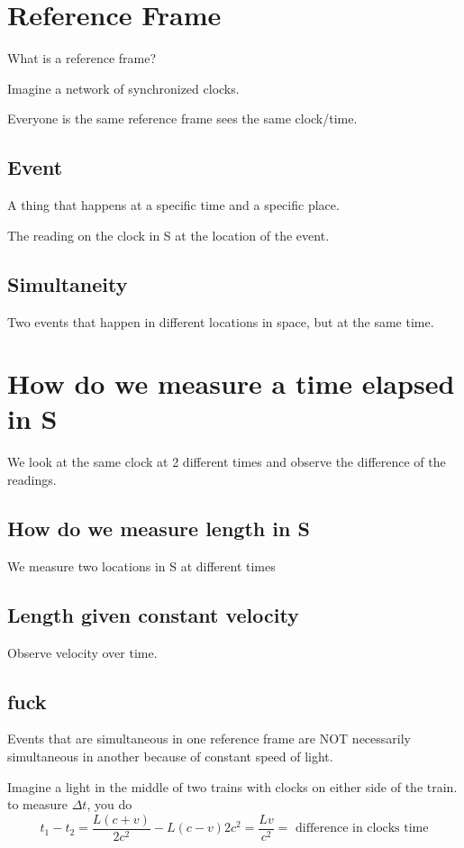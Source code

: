 \documentclass{report}
\begin{document}
\section{Reference Frame}
What is a reference frame?

Imagine a network of synchronized clocks.

Everyone is the same reference frame sees the same clock/time.

\subsection{Event}
A thing that happens at a specific time and a specific place.

The reading on the clock in S at the location of the event.

\subsection{Simultaneity}
Two events that happen in different locations in space, but at the same time.

\section{How do we measure a time elapsed in S}
We look at the same clock at 2 different times and observe the difference of the readings.

\subsection{How do we measure length in S}
We measure two locations in S at different times

\subsection{Length given constant velocity}
Observe velocity over time.

\subsection*{fuck}
Events that are simultaneous in one reference frame are NOT necessarily simultaneous in another because of constant speed of light.

Imagine a light in the middle of two trains with clocks on either side of the train. to measure $\Delta t$, you do
\[
t_1 - t_2 = \frac{L(c+v)}{2c^2} - {L(c-v)}{2c^2} = \frac{Lv}{c^2} = \textrm{ difference in clocks time}
\]
\end{document}
